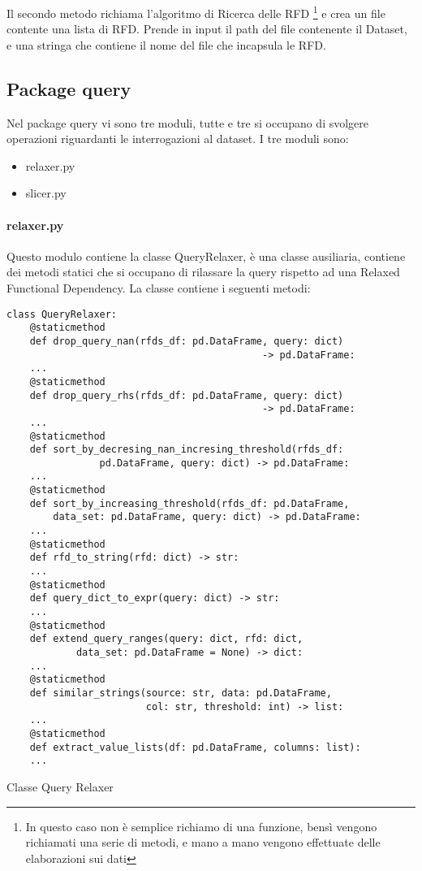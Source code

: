 Il secondo metodo richiama l'algoritmo di Ricerca delle RFD \footnote{In questo caso non è semplice richiamo di una funzione, bensì vengono richiamati una serie di metodi, e mano a mano vengono effettuate delle elaborazioni sui dati} e crea un file contente una lista di RFD. Prende in input il path del file contenente il Dataset, e una stringa che contiene il nome del file che incapsula le RFD. 

\subsection{Package query}
Nel package query vi sono tre moduli, tutte e tre si occupano di svolgere operazioni riguardanti le interrogazioni al dataset.
I tre moduli sono:
\begin{itemize}[noitemsep]
\let\labelitemi\labelitemii
    \item relaxer.py
    \item slicer.py
\end{itemize}

\paragraph{relaxer.py}
Questo modulo contiene la classe QueryRelaxer, è una classe ausiliaria, contiene dei metodi statici che si occupano di rilassare la query rispetto ad una Relaxed Functional Dependency. La classe contiene i seguenti metodi:

\begin{listing}[H]
\begin{verbatim}
class QueryRelaxer:
    @staticmethod
    def drop_query_nan(rfds_df: pd.DataFrame, query: dict) 
                                            -> pd.DataFrame:
    ...
    @staticmethod
    def drop_query_rhs(rfds_df: pd.DataFrame, query: dict)
                                            -> pd.DataFrame:
    ...
    @staticmethod
    def sort_by_decresing_nan_incresing_threshold(rfds_df: 
                pd.DataFrame, query: dict) -> pd.DataFrame:
    ...
    @staticmethod
    def sort_by_increasing_threshold(rfds_df: pd.DataFrame,
        data_set: pd.DataFrame, query: dict) -> pd.DataFrame:
    ...
    @staticmethod
    def rfd_to_string(rfd: dict) -> str:
    ...
    @staticmethod
    def query_dict_to_expr(query: dict) -> str:
    ...
    @staticmethod
    def extend_query_ranges(query: dict, rfd: dict, 
            data_set: pd.DataFrame = None) -> dict:
    ...
    @staticmethod
    def similar_strings(source: str, data: pd.DataFrame,
                        col: str, threshold: int) -> list:
    ...
    @staticmethod
    def extract_value_lists(df: pd.DataFrame, columns: list):
    ...
\end{verbatim}
\caption{Classe Query Relaxer}
\label{Code:10}
\end{listing}

